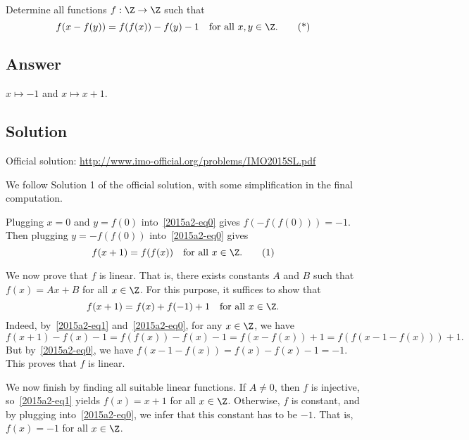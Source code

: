 Determine all functions $f : \Z \to \Z$ such that
\[ f(x - f(y)) = f(f(x)) - f(y) - 1 \quad \text{for all } x, y \in \Z. \tag{*}\label{2015a2-eq0} \]



\subsection*{Answer}

$x \mapsto -1$ and $x \mapsto x + 1$.



\subsection*{Solution}

Official solution: \url{http://www.imo-official.org/problems/IMO2015SL.pdf}

We follow Solution 1 of the official solution, with some simplification in the final computation.

Plugging $x = 0$ and $y = f(0)$ into~\eqref{2015a2-eq0} gives $f(-f(f(0))) = -1$.
Then plugging $y = -f(f(0))$ into~\eqref{2015a2-eq0} gives
\[ f(x + 1) = f(f(x)) \quad \text{for all } x \in \Z. \tag{1}\label{2015a2-eq1} \]

We now prove that $f$ is linear.
That is, there exists constants $A$ and $B$ such that $f(x) = Ax + B$ for all $x \in \Z$.
For this purpose, it suffices to show that
\[ f(x + 1) = f(x) + f(-1) + 1 \quad \text{for all } x \in \Z. \]
Indeed, by~\eqref{2015a2-eq1} and~\eqref{2015a2-eq0}, for any $x \in \Z$, we have
\[ f(x + 1) - f(x) - 1 = f(f(x)) - f(x) - 1 = f(x - f(x)) + 1 = f(f(x - 1 - f(x))) + 1. \]
But by~\eqref{2015a2-eq0}, we have $f(x - 1 - f(x)) = f(x) - f(x) - 1 = -1$.
This proves that $f$ is linear.

We now finish by finding all suitable linear functions.
If $A \neq 0$, then $f$ is injective, so~\eqref{2015a2-eq1} yields $f(x) = x + 1$ for all $x \in \Z$.
Otherwise, $f$ is constant, and by plugging into~\eqref{2015a2-eq0}, we infer that this constant has to be $-1$.
That is, $f(x) = -1$ for all $x \in \Z$.




